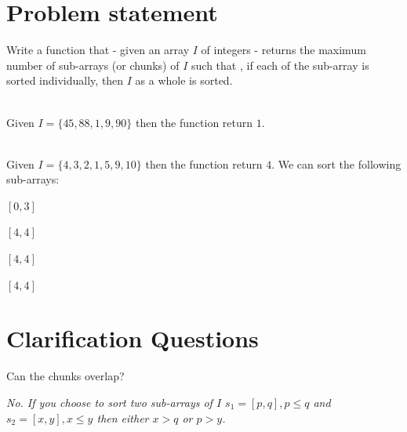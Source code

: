 \section{Problem statement}
\begin{exercise}
\label{example:max_num_chunks_sorted:exercice1}
Write a function that  - given an array $I$ of integers  - returns the maximum number of sub-arrays (or chunks) of $I$ 
such that , if each of the sub-array is sorted individually, then $I$ as a whole is sorted.

    \begin{example}
        \label{example:max_num_chunks_sorted:example1}
        \hfill \\
        Given $I=\{45,88,1,9,90\}$ then the function return $1$.
        
    \end{example}

    \begin{example}
        \label{example:max_num_chunks_sorted:example2}
        \hfill \\
        Given $I=\{4,3,2,1,5,9,10\}$ then the function return $4$. We can sort the following sub-arrays:
        \begin{itemize*}
            \item $[0,3]$
            \item $[4,4]$
            \item $[4,4]$
            \item $[4,4]$
        \end{itemize*}
    \end{example}
\end{exercise}

\section{Clarification Questions}

\begin{QandA}
    \item \begin{questionitem} \begin{question} Can the chunks overlap?   \end{question}      
    \begin{answered}
        \textit{No. If you choose to sort two sub-arrays of $I$ $s_1=[p,q], p\leq q$ and $s_2=[x,y], x\leq y$ then either $x > q$ or $p>y$.}
    \end{answered} \end{questionitem}
    
\end{QandA}

